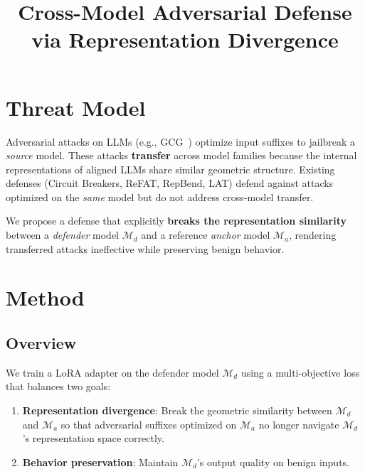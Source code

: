 \documentclass[11pt]{article}
\title{Cross-Model Adversarial Defense via Representation Divergence}
\author{}
\date{}
\begin{document}
\maketitle

\section{Threat Model}

Adversarial attacks on LLMs (e.g., GCG~\cite{zou2023universal}) optimize input suffixes to jailbreak a \emph{source} model. These attacks \textbf{transfer} across model families because the internal representations of aligned LLMs share similar geometric structure. Existing defenses (Circuit Breakers, ReFAT, RepBend, LAT) defend against attacks optimized on the \emph{same} model but do not address cross-model transfer.

We propose a defense that explicitly \textbf{breaks the representation similarity} between a \emph{defender} model $\mathcal{M}_d$ and a reference \emph{anchor} model $\mathcal{M}_a$, rendering transferred attacks ineffective while preserving benign behavior.

\section{Method}

\subsection{Overview}

We train a LoRA adapter on the defender model $\mathcal{M}_d$ using a multi-objective loss that balances two goals:
\begin{enumerate}[noitemsep]
    \item \textbf{Representation divergence}: Break the geometric similarity between $\mathcal{M}_d$ and $\mathcal{M}_a$ so that adversarial suffixes optimized on $\mathcal{M}_a$ no longer navigate $\mathcal{M}_d$'s representation space correctly.
    \item \textbf{Behavior preservation}: Maintain $\mathcal{M}_d$'s output quality on benign inputs.
\end{enumerate}
\end{document}
